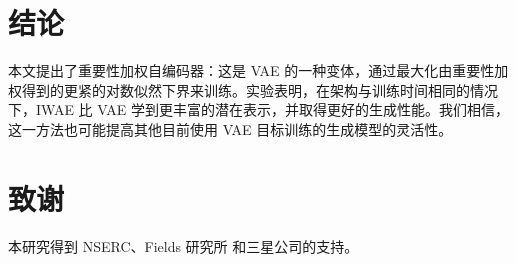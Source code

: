 \section{结论}
\label{sec:conclusion}

本文提出了重要性加权自编码器：这是 VAE 的一种变体，通过最大化由重要性加权得到的更紧的对数似然下界来训练。实验表明，在架构与训练时间相同的情况下，IWAE 比 VAE 学到更丰富的潜在表示，并取得更好的生成性能。我们相信，这一方法也可能提高其他目前使用 VAE 目标训练的生成模型的灵活性。

\section{致谢}
本研究得到 NSERC、Fields 研究所
和三星公司的支持。
